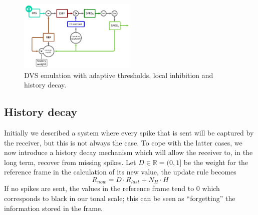 \documentclass[conference]{IEEEtran}
\begin{document}
\begin{figure}[htb]
  
  \includegraphics[width=0.5\textwidth]{dvs_emu_decay_adapt_inh}
  \caption{DVS emulation with adaptive thresholds, local inhibition and history decay.}
  \label{fig:dvs_emu_inh}
\end{figure}

\subsection{History decay} %

Initially we described a system where every spike that is sent will be captured by the receiver, but this is not always the case. To cope with the latter cases, we now introduce a history decay mechanism which will allow the receiver to, in the long term, recover from missing spikes. Let $D \in \mathbb{R} = (0, 1]$ be the weight for the reference frame in the calculation of its new value, the update rule becomes
\begin{equation}
\label{eq:ref_update_decay}
R_{now} = D\cdot R_{last} + N_{H}\cdot H
\end{equation}
If no spikes are sent, the values in the reference frame tend to 0 which corresponds to black in our tonal scale; this can be seen as ``forgetting'' the information stored in the frame.
%

\end{document}
